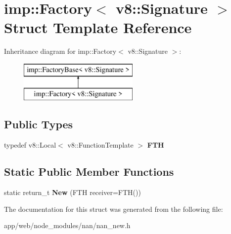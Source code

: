 \hypertarget{structimp_1_1_factory_3_01v8_1_1_signature_01_4}{}\section{imp\+:\+:Factory$<$ v8\+:\+:Signature $>$ Struct Template Reference}
\label{structimp_1_1_factory_3_01v8_1_1_signature_01_4}
Inheritance diagram for imp\+:\+:Factory$<$ v8\+:\+:Signature $>$\+:\begin{figure}[H]
\begin{center}
\leavevmode
\includegraphics[height=2.000000cm]{structimp_1_1_factory_3_01v8_1_1_signature_01_4}
\end{center}
\end{figure}
\subsection*{Public Types}
\begin{DoxyCompactItemize}
\item 
\mbox{\label{structimp_1_1_factory_3_01v8_1_1_signature_01_4_ae8381d48f591daf8a1a8abd4eed64f0c}} 
typedef v8\+::\+Local$<$ v8\+::\+Function\+Template $>$ {\bfseries F\+TH}
\end{DoxyCompactItemize}
\subsection*{Static Public Member Functions}
\begin{DoxyCompactItemize}
\item 
\mbox{\label{structimp_1_1_factory_3_01v8_1_1_signature_01_4_ae2d7a49421b5a6b32ebdd04ae43e866f}} 
static return\+\_\+t {\bfseries New} (F\+TH receiver=F\+TH())
\end{DoxyCompactItemize}


The documentation for this struct was generated from the following file\+:\begin{DoxyCompactItemize}
\item 
app/web/node\+\_\+modules/nan/nan\+\_\+new.\+h\end{DoxyCompactItemize}
